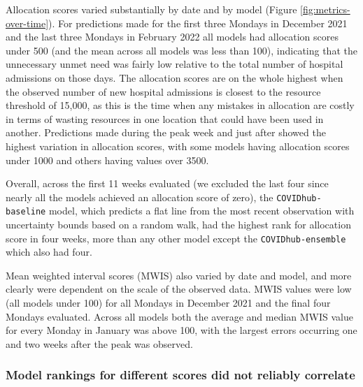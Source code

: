 \documentclass{article}\usepackage[]{graphicx}\usepackage[]{xcolor}
\begin{document}
Allocation scores varied substantially by date and by model (Figure \ref{fig:metrics-over-time}).
For predictions made for the first three Mondays in December 2021 and the last three Mondays in February 2022 all models had allocation scores under 500 (and the mean across all models was less than 100), indicating that the unnecessary unmet need was fairly low relative to the total number of hospital admissions on those days.
The allocation scores are on the whole highest when the observed number of new hospital admissions is closest to the resource threshold of 15,000, as this is the time when any mistakes in allocation are costly in terms of wasting resources in one location that could have been used in another.
Predictions made during the peak week and just after showed the highest variation in allocation scores, with some models having allocation scores under 1000 and others having values over 3500.



Overall, across the first 11 weeks evaluated (we excluded the last four since nearly all the models achieved an allocation score of zero), the \texttt{COVIDhub-baseline} model, which predicts a flat line from the most recent observation with uncertainty bounds based on a random walk, had the highest rank for allocation score in four weeks, more than any other model except the \texttt{COVIDhub-ensemble} which also had four.




Mean weighted interval scores (MWIS) also varied by date and model, and more clearly were dependent on the scale of the observed data.
MWIS values were low (all models under 100) for all Mondays in December 2021 and the final four Mondays evaluated.
Across all models both the average and median MWIS value for every Monday in January was above 100, with the largest errors occurring one and two weeks after the peak was observed.



\subsubsection{Model rankings for different scores did not reliably correlate}
\end{document}
